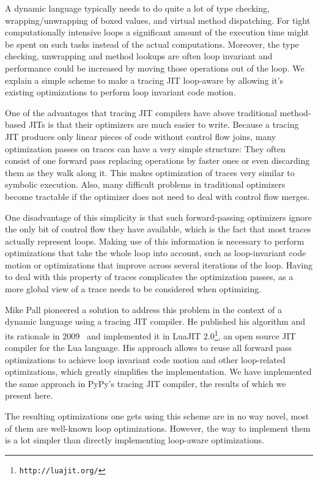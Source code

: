 \documentclass[preprint]{sigplanconf}
\let\oldcite=\cite
\renewcommand\cite[1]{\ifthenelse{\equal{#1}{XXX}}{[citation~needed]}{\oldcite{#1}}}
\begin{document}
A dynamic language typically needs to do quite a lot of type
checking, wrapping/unwrapping of boxed values, and virtual method dispatching. 
For tight computationally intensive loops a
significant amount of the execution time might be spent on such tasks
instead of the actual computations. Moreover, the type checking,
unwrapping and method lookups are often loop invariant and performance could be increased
by moving those operations out of the loop. We explain a simple scheme
to make a tracing JIT loop-aware by allowing it's existing optimizations to
perform loop invariant code motion. 

One of the advantages that tracing JIT compilers have above traditional
method-based
JITs is that their optimizers are much easier to write. Because a tracing JIT
produces only linear pieces of code without control flow joins, many
optimization passes on traces can have a very simple structure: They often
consist of one forward pass replacing operations by faster ones or even
discarding them as they walk along it. This makes
optimization of traces very similar to symbolic execution. Also, many
difficult problems in traditional optimizers become tractable if the optimizer
does not need to deal with control flow merges.

One disadvantage of this simplicity is that such forward-passing
optimizers ignore the only bit of control flow they have available, which is
the fact that most traces actually represent loops. Making use of this
information is necessary to perform optimizations that take the whole loop into
account, such as loop-invariant code
motion or optimizations that improve across several iterations of the loop.
Having to deal with this property of traces complicates the optimization passes,
as a more global view of a trace needs to be considered when optimizing.

Mike Pall pioneered a solution to address this problem in the context of a
dynamic language using a tracing JIT compiler. He published his algorithm and
its rationale in 2009~\cite{pall_luajit_2009} and implemented it in LuaJIT
2.0\footnote{\texttt{http://luajit.org/}}, an open source JIT compiler for the Lua
language. His approach allows to reuse all forward pass
optimizations to achieve loop invariant code motion and other loop-related
optimizations, which greatly simplifies the implementation. We have implemented
the same approach in PyPy's tracing JIT compiler, the results of which we
present here.

The resulting optimizations one gets using this scheme are in no way novel, most
of them are well-known loop optimizations. However, the way to implement them is
a lot simpler than directly implementing loop-aware optimizations.
\end{document}
